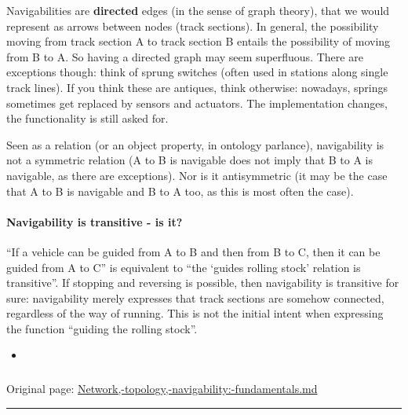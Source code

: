\documentclass[
  11pt,
]{article}
\providecommand{\tightlist}{%
  \setlength{\itemsep}{0pt}\setlength{\parskip}{0pt}}
\begin{document}
Navigabilities are \textbf{directed} edges (in the sense of graph
theory), that we would represent as arrows between nodes (track
sections). In general, the possibility moving from track section A to
track section B entails the possibility of moving from B to A. So having
a directed graph may seem superfluous. There are exceptions though:
think of sprung switches (often used in stations along single track
lines). If you think these are antiques, think otherwise: nowadays,
springs sometimes get replaced by sensors and actuators. The
implementation changes, the functionality is still asked for.

Seen as a relation (or an object property, in ontology parlance),
navigability is not a symmetric relation (A to B is navigable does not
imply that B to A is navigable, as there are exceptions). Nor is it
antisymmetric (it may be the case that A to B is navigable and B to A
too, as this is most often the case).

\hypertarget{navigability-is-transitive---is-it}{%
\paragraph{Navigability is transitive - is
it?}\label{navigability-is-transitive---is-it}}

``If a vehicle can be guided from A to B and then from B to C, then it
can be guided from A to C'' is equivalent to ``the `guides rolling
stock' relation is transitive''. If stopping and reversing is possible,
then navigability is transitive for sure: navigability merely expresses
that track sections are somehow connected, regardless of the way of
running. This is not the initial intent when expressing the function
``guiding the rolling stock''.

\begin{itemize}
\tightlist
\item
\end{itemize}

\hypertarget{section}{%
\subsubsection{}\label{section}}

Original page:
\href{https://github.com/UICrail/CDM-RSM/wiki/Network\%2C-topology\%2C-navigability\%3A-fundamentals}{Network,-topology,-navigability:-fundamentals.md}

\begin{center}\rule{0.5\linewidth}{0.5pt}\end{center}
\end{document}
